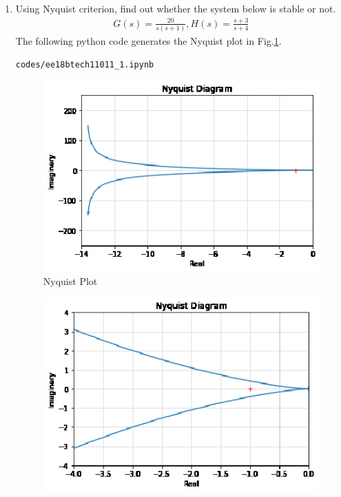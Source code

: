 \begin{enumerate}[label=\thesubsection.\arabic*.,ref=\thesubsection.\theenumi]
\item Using Nyquist criterion, find out whether the system below is stable or not.
\begin{align}
\label{eq:ee18btech11011_system}
 G(s)=\frac{20}{s(s+1)} , 
 H(s)=\frac{s+3}{s+4}
\end{align}
\solution The following python code generates the Nyquist plot in Fig.\ref{fig:ee18btech11011}.
\begin{lstlisting}
codes/ee18btech11011_1.ipynb
\end{lstlisting}
\begin{figure}[ht!]
  \includegraphics[width=\columnwidth]{./figs/ee18btech11011.eps}
  \caption{Nyquist Plot}
  \label{fig:ee18btech11011}
\end{figure}
\begin{figure}[ht!]
  \includegraphics[width=\columnwidth]{./figs/zoomed.eps}

\end{figure}
\end{enumerate}
